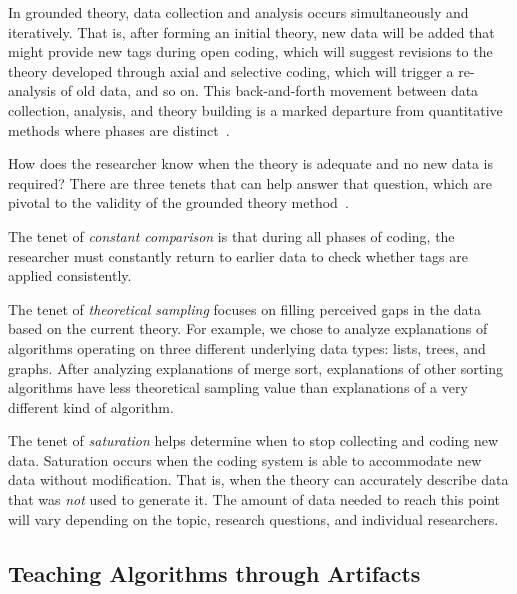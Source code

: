 \documentclass[sigconf]{acmart}
\begin{document}
In grounded theory, data collection and analysis occurs simultaneously and
iteratively. That is, after forming an initial theory, new data will be added
that might provide new tags during open coding, which will suggest revisions to
the theory developed through axial and selective coding, which will trigger a
re-analysis of old data, and so on.
%
This back-and-forth movement between data collection, analysis, and theory
building is a marked departure from quantitative methods where phases are
distinct~\cite{Strauss67discoveryof}.


How does the researcher know when the theory is adequate and no new data is
required? There are three tenets that can help answer that question, which
are pivotal to the validity of the grounded theory
method~\cite{Strauss67discoveryof}.
%
\begin{enumerate*}
%
\item The tenet of \emph{constant comparison} is that during all phases of
coding, the researcher must constantly return to earlier data to check whether
tags are applied consistently.
%
\item The tenet of \emph{theoretical sampling} focuses on filling perceived
gaps in the data based on the current theory. For example, we chose to analyze
explanations of algorithms operating on three different underlying data types:
lists, trees, and graphs. After analyzing explanations of merge sort,
explanations of other sorting algorithms have less theoretical sampling value
than explanations of a very different kind of algorithm.
%
\item The tenet of \emph{saturation} helps determine when to stop collecting
and coding new data. Saturation occurs when the coding system is able to
accommodate new data without modification. That is, when the theory can
accurately describe data that was \emph{not} used to generate it. The amount of
data needed to reach this point will vary depending on the topic, research
questions, and individual researchers.
%
\end{enumerate*}


\subsection{Teaching Algorithms through Artifacts}
\label{sec:back:rw}

\end{document}
